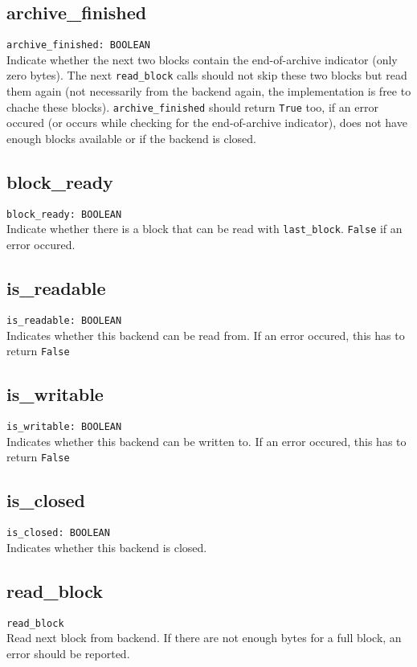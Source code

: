 \subsection{archive\_finished}
\lstinline;archive_finished: BOOLEAN;\\
Indicate whether the next two blocks contain the end-of-archive indicator
(only zero bytes). The next \lstinline;read_block; calls should not skip these
two blocks but read them again (not necessarily from the backend again, the
implementation is free to chache these blocks).
\lstinline;archive_finished; should return \lstinline;True; too, if an error
occured (or occurs while checking for the end-of-archive indicator), does not
have enough blocks available or if the backend is closed.

\subsection{block\_ready}
\lstinline;block_ready: BOOLEAN;\\
Indicate whether there is a block that can be read with \lstinline;last_block;.
\lstinline;False; if an error occured.


\subsection{is\_readable}
\lstinline;is_readable: BOOLEAN;\\
Indicates whether this backend can be read from. If an error occured, this has
to return \lstinline;False;

\subsection{is\_writable}
\lstinline;is_writable: BOOLEAN;\\
Indicates whether this backend can be written to. If an error occured, this has
to return \lstinline;False;

\subsection{is\_closed}
\lstinline;is_closed: BOOLEAN;\\
Indicates whether this backend is closed.

\subsection{read\_block}
\lstinline;read_block;\\
Read next block from backend. If there are not enough bytes for a full block, an
error should be reported.

